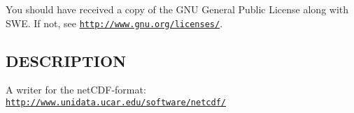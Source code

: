 You should have received a copy of the G\-N\-U General Public License along with S\-W\-E. If not, see \href{http://www.gnu.org/licenses/}{\tt http\-://www.\-gnu.\-org/licenses/}.\hypertarget{NetCdfWriter_8hh_DESCRIPTION}{}\subsection{D\-E\-S\-C\-R\-I\-P\-T\-I\-O\-N}\label{NetCdfWriter_8hh_DESCRIPTION}
A writer for the net\-C\-D\-F-\/format\-: \href{http://www.unidata.ucar.edu/software/netcdf/}{\tt http\-://www.\-unidata.\-ucar.\-edu/software/netcdf/} 